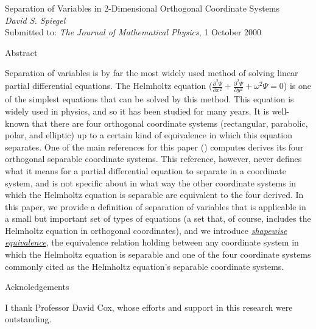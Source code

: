 \documentclass[onecolumn,10pt]{article}
\newcommand{\emu}[1]{\emph{\underline{#1}}}
\newcommand{\parr}[2]{\frac{\partial #1}{\partial #2}}
\begin{document}
\baselineskip 21pt
\evensidemargin 0.25in
\footnotesep 14pt

\begin{center}
\LARGE Separation of Variables in 2-Dimensional Orthogonal Coordinate Systems \\
\normalsize \emph{David S. Spiegel} \\[\medskipamount]
Submitted to: \emph{The Journal of Mathematical Physics}, 1 October 2000 \\

\end{center}

\evensidemargin 0in

\vspace{12pt}

\noindent \LARGE Abstract
\normalsize

\noindent Separation of variables is by far the most widely used method of solving linear partial differential equations.  The Helmholtz equation ($\parr{^2\Psi}{x^2} + \parr{^2\Psi}{y^2} + \omega^2\Psi = 0$) is one of the simplest equations that can be solved by this method.  This equation is widely used in physics, and so it has been studied for many years.  It is well-known that there are four orthogonal coordinate systems (rectangular, parabolic, polar, and elliptic) up to a certain kind of equivalence in which this equation separates.  One of the main references for this paper (\cite{miller}) computes derives its four orthogonal separable coordinate systems.  This reference, however, never defines what it means for a partial differential equation to separate in a coordinate system, and is not specific about in what way the other coordinate systems in which the Helmholtz equation is separable are equivalent to the four derived.  In this paper, we provide a definition of separation of variables that is applicable in a small but important set of types of equations (a set that, of course, includes the Helmholtz equation in orthogonal coordinates), and we introduce \emu{shapewise equivalence}, the equivalence relation holding between any coordinate system in which the Helmholtz equation is separable and one of the four coordinate systems commonly cited as the Helmholtz equation's separable coordinate systems.

\newpage



\vspace{12pt}

\noindent \LARGE Acknoledgements
\normalsize

\noindent I thank Professor David Cox, whose efforts and support in this research were outstanding.


\end{document}
